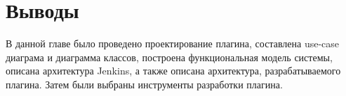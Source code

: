 \section{Выводы} \label{ch1:sec7}

В данной главе было проведено проектирование плагина, составлена use-case диаграма и диаграмма классов, построена функциональная модель системы, описана архитектура Jenkins, а также описана архитектура, разрабатываемого плагина. Затем были выбраны инструменты разработки плагина.


%
